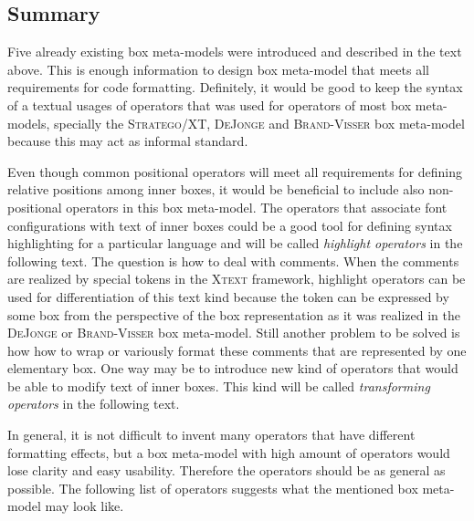 \documentclass[12pt,notitlepage,a4paper]{report}
\begin{document}
\begin{itemize}
\end{itemize}

\subsection{Summary}
\label{IdealMetaModel}
Five already existing box meta-models  were introduced and described in the text above. This is enough information to design box meta-model that meets all requirements for code formatting. Definitely, it would be good to keep the syntax of a textual usages of operators that was used for operators of most box meta-models, specially the \textsc{Stratego/XT}, \textsc{DeJonge} and \textsc{Brand-Visser} box meta-model because this may act as informal standard.

Even though common positional operators will meet all requirements for defining relative positions among inner boxes, it would be beneficial to include also non-positional operators in this box meta-model. The operators that associate font configurations with text of inner boxes could be a good tool for defining syntax highlighting for a particular language and will be called \textit{highlight operators} in the following text. The question is how to deal with comments. When the comments are realized by special tokens in the \textsc{Xtext} framework, highlight operators can be used for differentiation of this text kind because the token can be expressed by some box from the perspective of the box representation as it was realized in the \textsc{DeJonge} or \textsc{Brand-Visser} box meta-model. Still another problem to be solved is how how to wrap or variously format these comments that are represented by one elementary box. One way may be to introduce new kind of operators that would be able to modify text of inner boxes. This kind will be called \textit{transforming operators} in the following text.

In general, it is not difficult to invent many operators that  have  different formatting effects, but a box meta-model with high amount of operators would lose clarity and easy usability. Therefore the operators should be as general as possible. The following list of operators suggests what  the mentioned box meta-model may look like.  
\end{document}

